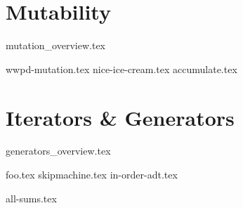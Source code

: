 \documentclass{exam}
\begin{document}
\section{Mutability}
	{mutation_overview.tex}
	\begin{questions}
		{wwpd-mutation.tex}
    {nice-ice-cream.tex}
    {accumulate.tex}
	\end{questions}

\newpage
\section{Iterators \& Generators}
{generators_overview.tex}
\begin{questions}
    {foo.tex}
{skipmachine.tex}
{in-order-adt.tex}

{all-sums.tex}


\end{questions}
\end{document}
